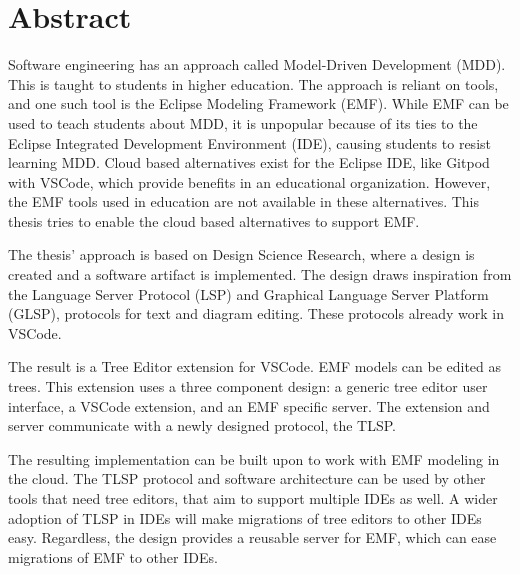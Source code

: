 \chapter*{Abstract}

Software engineering has an approach called Model-Driven Development (MDD).
This is taught to students in higher education.
The approach is reliant on tools, and one such tool is the Eclipse Modeling Framework (EMF).
While EMF can be used to teach students about MDD, it is unpopular because of its ties to the Eclipse Integrated Development Environment (IDE), causing students to resist learning MDD.
Cloud based alternatives exist for the Eclipse IDE, like Gitpod with VSCode, which provide benefits in an educational organization.
However, the EMF tools used in education are not available in these alternatives.
This thesis tries to enable the cloud based alternatives to support EMF.

The thesis' approach is based on Design Science Research, where a design is created and a software artifact is implemented.
The design draws inspiration from the Language Server Protocol (LSP) and Graphical Language Server Platform (GLSP), protocols for text and diagram editing.
These protocols already work in VSCode.

The result is a Tree Editor extension for VSCode.
EMF models can be edited as trees.
This extension uses a three component design: a generic tree editor user interface, a VSCode extension, and an EMF specific server.
The extension and server communicate with a newly designed protocol, the \acrfull{TLSP}.

The resulting implementation can be built upon to work with \acrshort{EMF} modeling in the cloud.
The \acrshort{TLSP} protocol and software architecture can be used by other tools that need tree editors, that aim to support multiple IDEs as well.
A wider adoption of \acrshort{TLSP} in IDEs will make migrations of tree editors to other IDEs easy.
Regardless, the design provides a reusable server for EMF, which can ease migrations of EMF to other IDEs.
